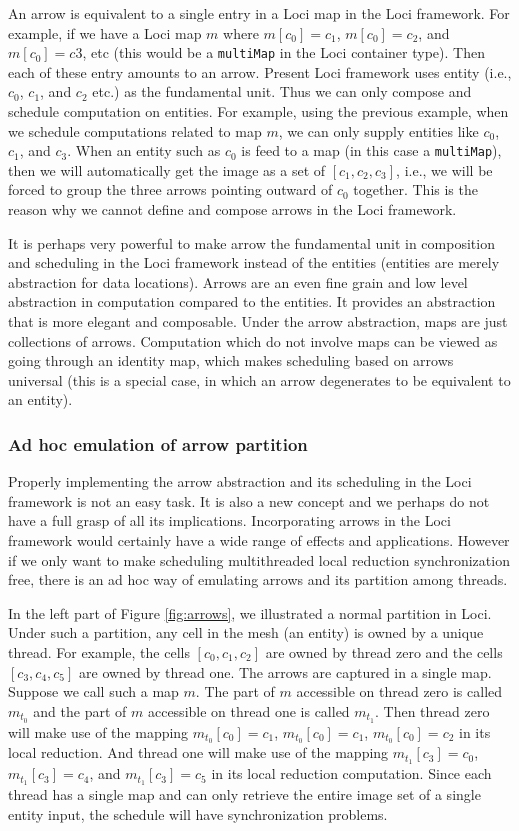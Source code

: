 \documentclass{article}
\begin{document}
An arrow is equivalent to a single entry in a Loci map in the Loci
framework.  For example, if we have a Loci map $m$ where $m[c_0] = c_1$,
$m[c_0] = c_2$, and $m[c_0] = c3$, etc (this would be a
\lstinline{multiMap} in the Loci container type).  Then each of these
entry amounts to an arrow.  Present Loci framework uses entity (i.e.,
$c_0$, $c_1$, and $c_2$ etc.) as the fundamental unit.  Thus we can only
compose and schedule computation on entities.  For example, using the
previous example, when we schedule computations related to map $m$, we
can only supply entities like $c_0$, $c_1$, and $c_3$.  When an entity
such as $c_0$ is feed to a map (in this case a \lstinline{multiMap}),
then we will automatically get the image as a set of $[c_1,c_2,c_3]$,
i.e., we will be forced to group the three arrows pointing outward of
$c_0$ together.  This is the reason why we cannot define and compose
arrows in the Loci framework.

It is perhaps very powerful to make arrow the fundamental unit in
composition and scheduling in the Loci framework instead of the
entities (entities are merely abstraction for data locations).  Arrows
are an even fine grain and low level abstraction in computation compared
to the entities.  It provides an abstraction that is more elegant and
composable.  Under the arrow abstraction, maps are just collections of
arrows.  Computation which do not involve maps can be viewed as going
through an identity map, which makes scheduling based on arrows
universal (this is a special case, in which an arrow degenerates to be
equivalent to an entity).

\subsubsection{Ad hoc emulation of arrow partition}
Properly implementing the arrow abstraction and its scheduling in the
Loci framework is not an easy task.  It is also a new concept and we
perhaps do not have a full grasp of all its implications.  Incorporating
arrows in the Loci framework would certainly have a wide range of
effects and applications.  However if we only want to make scheduling
multithreaded local reduction synchronization free, there is an ad hoc
way of emulating arrows and its partition among threads.

In the left part of Figure \ref{fig:arrows}, we illustrated a normal
partition in Loci.  Under such a partition, any cell in the mesh (an
entity) is owned by a unique thread.  For example, the cells
$[c_0,c_1,c_2]$ are owned by thread zero and the cells $[c_3,c_4,c_5]$
are owned by thread one.  The arrows are captured in a single map.
Suppose we call such a map $m$.  The part of $m$ accessible on thread
zero is called $m_{t_0}$ and the part of $m$ accessible on thread one is
called $m_{t_1}$.  Then thread zero will make use of the mapping
$m_{t_0}[c_0] = c_1$, $m_{t_0}[c_0] = c_1$, $m_{t_0}[c_0] = c_2$ in its
local reduction.  And thread one will make use of the mapping
$m_{t_1}[c_3] = c_0$, $m_{t_1}[c_3] = c_4$, and $m_{t_1}[c_3] = c_5$ in
its local reduction computation.  Since each thread has a single map and
can only retrieve the entire image set of a single entity input, the
schedule will have synchronization problems.
\end{document}
